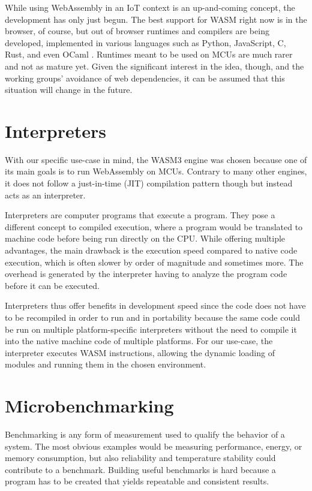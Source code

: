 While using WebAssembly in an IoT context is an up-and-coming concept, the development has only just begun. The best support for WASM right now is in the browser, of course, but out of browser runtimes and compilers are being developed, implemented in various languages such as Python, JavaScript, C, Rust, and even OCaml \autocite{akinyemi_appcypherawesome-wasm-runtimes_2020}. Runtimes meant to be used on MCUs are much rarer and not as mature yet. Given the significant interest in the idea, though, and the working groups' avoidance of web dependencies, it can be assumed that this situation will change in the future.

\section{Interpreters}

With our specific use-case in mind, the WASM3 \autocite{noauthor_wasm3wasm3_2020} engine was chosen because one of its main goals is to run WebAssembly on MCUs. Contrary to many other engines, it does not follow a just-in-time (JIT) compilation pattern though but instead acts as an interpreter.

Interpreters are computer programs that execute a program. They pose a different concept to compiled execution, where a program would be translated to machine code before being run directly on the CPU. While offering multiple advantages, the main drawback is the execution speed compared to native code execution, which is often slower by order of magnitude and sometimes more. The overhead is generated by the interpreter having to analyze the program code before it can be executed.

Interpreters thus offer benefits in development speed since the code does not have to be recompiled in order to run and in portability because the same code could be run on multiple platform-specific interpreters without the need to compile it into the native machine code of multiple platforms. For our use-case, the interpreter executes WASM instructions, allowing the dynamic loading of modules and running them in the chosen environment.

\section{Microbenchmarking}

Benchmarking is any form of measurement used to qualify the behavior of a system. The most obvious examples would be measuring performance, energy, or memory consumption, but also reliability and temperature stability could contribute to a benchmark. Building useful benchmarks is hard because a program has to be created that yields repeatable and consistent results.

